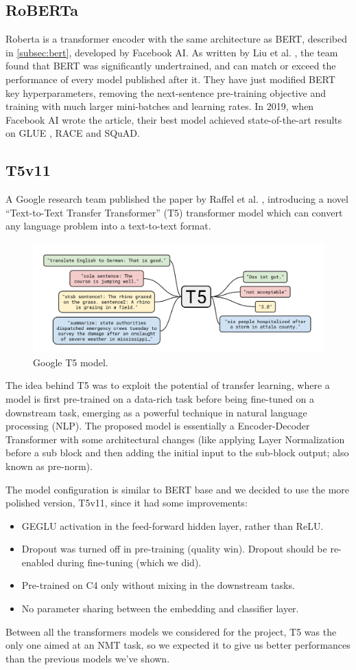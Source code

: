 \subsection{RoBERTa}
Roberta is a transformer encoder with the same architecture as BERT, described in \ref{subsec:bert}, developed by Facebook AI. As written by Liu et al. \cite{liu2019roberta}, the team found that BERT was significantly undertrained, and can match or exceed the performance of every model published after it. They have just modified BERT key hyperparameters, removing the next-sentence pre-training objective and training with much larger mini-batches and learning rates. In 2019, when Facebook AI wrote the article, their best model achieved state-of-the-art results on GLUE \cite{wang2018glue}, RACE and SQuAD.
\subsection{T5v11}
A Google research team published the paper by Raffel et al. \cite{raffel2019exploring}, introducing a novel “Text-to-Text Transfer Transformer” (T5) transformer model which can convert any language problem into a text-to-text format.
\begin{figure}[H]
    \centering
    \includegraphics[width = .7\linewidth]{images/google_T5.png}
    \caption{Google T5 model.}
    \label{fig:google_t5}
\end{figure}
The idea behind T5 was to exploit the potential of transfer learning, where a model is first pre-trained on a data-rich task before being fine-tuned on a downstream task, emerging as a powerful technique in natural language processing (NLP). The proposed model is essentially a Encoder-Decoder Transformer with some architectural changes (like applying Layer Normalization before a sub block and then adding the initial input to the sub-block output; also known as pre-norm).
\vspace{3mm}

The model configuration is similar to BERT base and we decided to use the more polished version, T5v11, since it had some improvements:
\begin{itemize}
    \item GEGLU activation in the feed-forward hidden layer, rather than ReLU.
    \item Dropout was turned off in pre-training (quality win). Dropout should be re-enabled during fine-tuning (which we did).
    \item Pre-trained on C4 only without mixing in the downstream tasks.
    \item No parameter sharing between the embedding and classifier layer.
\end{itemize}
Between all the transformers models we considered for the project, T5 was the only one aimed at an NMT task, so we expected it to give us better performances than the previous models we've shown.